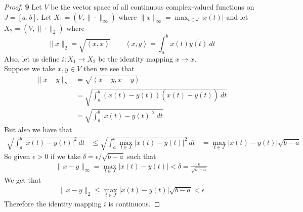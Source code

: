 \documentclass[11pt]{article}
\newcommand{\inprd}[1]{\left\langle{#1}\right\rangle}
\theoremstyle{definition}
\begin{document}
\cleardoublepage
\begin{proof}{\textbf{9}}
Let $V$ be the vector space of all continuous complex-valued functions on
$J = [a,b]$. Let $X_1 = (V, \|\cdot\|_\infty)$ where
$\|x\|_{\infty} = \max_{t \in J} |x(t)|$ and let $X_2 = (V, \|\cdot\|_2)$ where
$$\|x\|_2 = \sqrt{\inprd{x,x}} \qquad \inprd{x,y} = \int_{a}^b x(t)\overline{y(t)}~dt$$
Also, let us define $i: X_1 \to X_2$ be the identity mapping $x \to x$.\\
Suppose we take $x,y \in V$ then we see that
\begin{align*}
    \|x - y\|_2 &= \sqrt{\inprd{x - y,x - y}}\\
    &= \sqrt{\int_{a}^b (x(t) - y(t))(\overline{x(t) - y(t)})~dt}\\
    &= \sqrt{\int_{a}^b |x(t) - y(t)|^2~dt}
\end{align*}
But also we have that
\begin{align*}
    \sqrt{\int_{a}^b |x(t) - y(t)|^2~dt}
    &\leq \sqrt{\int_{a}^b \max_{t \in J}|x(t) - y(t)|^2~dt}
    &= \max_{t \in J}|x(t) - y(t)| \sqrt{b -a}
\end{align*}
So given $\epsilon > 0$ if we take $\delta = \epsilon/\sqrt{b - a}$ such that
\begin{align*}
    \|x - y\|_{\infty} = \max_{t \in J} |x(t) - y(t)| < \delta
    = \frac{\epsilon}{\sqrt{b - a}}
\end{align*}
We get that
\begin{align*}
    \|x - y\|_2 \leq \max_{t \in J}|x(t) - y(t)| \sqrt{b -a} < \epsilon
\end{align*}
Therefore the identity mapping $i$ is continuous.

\end{proof}
\end{document}
